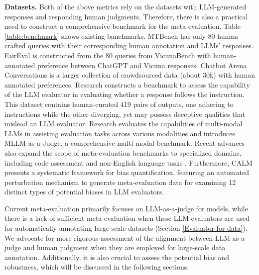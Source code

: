 \textbf{Datasets.} Both of the above metrics rely on the datasets with LLM-generated responses and responding human judgments.
Therefore, there is also a practical need to construct a comprehensive benchmark for the meta-evaluation. 
Table \ref{table:benchmark} shows existing banchmarks.
MTBench \citep{nips_llm_as_a_judge} has only 80 human-crafted queries with their corresponding human annotation and LLMs' responses.
FairEval \citep{wang-etal-2024-large-language-models-fair} is constructed from the 80 queries from VicunaBench \citep{vicuna2023} with human-annotated preference between ChatGPT and Vicuna responses.
Chatbot Arena Conversations \citep{nips_llm_as_a_judge} is a larger collection of crowdsourced data (about 30k) with human annotated preferences.
Research \cite{zeng2023llmbar} constructs a benchmark to assess the capability of the LLM evaluator in evaluating whether a response follows the instruction.
This dataset contains human-curated 419 pairs of outputs, one adhering to instructions while the other diverging, yet may possess deceptive qualities that mislead an LLM evaluator.
Research \cite{mllm-as-a-judge} evaluates the capabilities of multi-modal LLMs in assisting evaluation tasks across various modalities and introduces MLLM-as-a-Judge, a comprehensive multi-modal benchmark.
Recent advances also expand the scope of meta-evaluation benchmarks to specialized domains, including code assessment \citep{zhao2024codejudge} and non-English language tasks \citep{son2024llm}. 
Furthermore, CALM \citep{ye2024justice} presents a systematic framework for bias quantification, featuring an automated perturbation mechanism to generate meta-evaluation data for examining 12 distinct types of potential biases in LLM evaluators.


Current meta-evaluation primarily focuses on LLM-as-a-judge for models, while there is a lack of sufficient meta-evaluation when these LLM evaluators are used for automatically annotating large-scale datasets (Section \ref{Evaluator for data}). 
We advocate for more rigorous assessment of the alignment between LLM-as-a-judge and human judgment when they are employed for large-scale data annotation. 
Additionally, it is also crucial to assess the potential bias and robustness, which will be discussed in the following sections.

